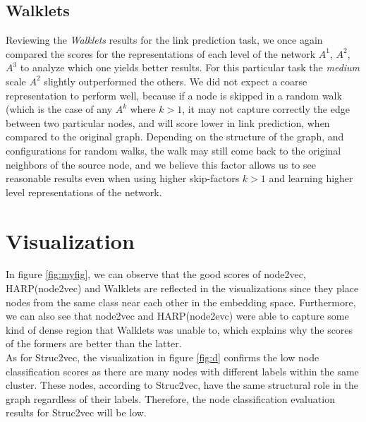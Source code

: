 \documentclass[a4paper,13pt]{article}
\begin{document}
\subsection{\textbf{Walklets}}
Reviewing the \textit{Walklets} results for the link prediction task, we once again compared the scores for the representations of each level of the network $A^1$, $A^2$, $A^3$ to analyze which one yields better results. For this particular task the \textit{medium} scale $A^2$ slightly outperformed the others. We did not expect a coarse representation to perform well, because if a node is skipped in a random walk (which is the case of any $A^k$ where $k>1$, it may not capture correctly the edge between two particular nodes, and will score lower in link prediction, when compared to the original graph. Depending on the structure of the graph, and configurations for random walks, the walk may still come back to the original neighbors of the source node, and we believe this factor allows us to see reasonable results even when using higher skip-factors $k>1$ and learning higher level representations of the network.

\section{Visualization}

In figure \ref{fig:myfig}, we can observe that the good scores of node2vec, HARP(node2vec) and Walklets are reflected in the visualizations since they place nodes from the same class near each other in the embedding space. Furthermore, we can also see that node2vec and HARP(node2evc) were able to capture some kind of dense region that Walklets was unable to, which explains why the scores of the formers are better than the latter. \\
As for Struc2vec, the visualization in figure \ref{fig:d} confirms the low node classification scores as there are many nodes with different labels within the same cluster. These nodes, according to Struc2vec, have the same structural role in the graph regardless of their labels. Therefore, the node classification evaluation results for Struc2vec will be low. 
\end{document}
